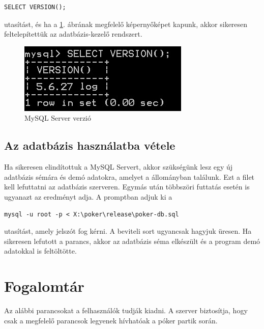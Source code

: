  \begin{verbatim}
SELECT VERSION();
\end{verbatim}
utasítást, és ha a \ref{fig:mysql_version}. ábrának megfelelő képernyőképet kapunk, akkor sikeresen feltelepítettük az adatbázis-kezelő rendszert.
\begin{figure}[h!]
  \caption{MySQL Server verzió}
  \label{fig:mysql_version}
  \centering
    \includegraphics{user-documentation/images/mysql_version.jpg}
\end{figure}

\subsection{Az adatbázis használatba vétele}
Ha sikeresen elindítottuk a MySQL Servert, akkor szükségünk lesz egy új adatbázis sémára és demó adatokra, amelyet a  állományban találunk. Ezt a filet kell lefuttatni az adatbázis szerveren. Egymás után többszöri futtatás esetén is ugyanazt az eredményt adja. A promptban adjuk ki a
 \begin{verbatim}
mysql -u root -p < X:\poker\release\poker-db.sql
\end{verbatim}
utasítást, amely jelszót fog kérni. A beviteli sort ugyancsak hagyjuk üresen. Ha sikeresen lefutott a parancs, akkor az adatbázis séma elkészült és a program demó adatokkal is feltöltötte.

\section{Fogalomtár}
Az alábbi parancsokat a felhasználók tudják kiadni. A szerver biztosítja, hogy csak a megfelelő parancsok legyenek hívhatóak a póker partik során.
